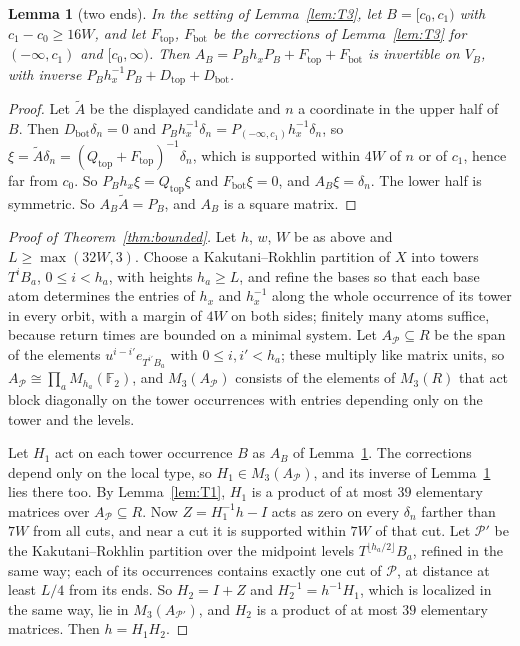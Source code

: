 \documentclass[11pt]{amsart}
\newtheorem{lemma}[theorem]{Lemma}
\theoremstyle{remark}
\newcommand{\F}{\mathbb F}
\begin{document}
\begin{lemma}[two ends]\label{lem:T4}
In the setting of Lemma~\ref{lem:T3}, let $B=[c_0,c_1)$ with
$c_1-c_0\ge16W$, and let $F_{\mathrm{top}}$, $F_{\mathrm{bot}}$ be the
corrections of Lemma~\ref{lem:T3} for $(-\infty,c_1)$ and $[c_0,\infty)$.
Then $A_B=P_Bh_xP_B+F_{\mathrm{top}}+F_{\mathrm{bot}}$ is invertible on
$V_B$, with inverse $P_Bh_x^{-1}P_B+D_{\mathrm{top}}+D_{\mathrm{bot}}$.
\end{lemma}

\begin{proof}
Let $\tilde A$ be the displayed candidate and $n$ a coordinate in the upper
half of $B$. Then $D_{\mathrm{bot}}\delta_n=0$ and
$P_Bh_x^{-1}\delta_n=P_{(-\infty,c_1)}h_x^{-1}\delta_n$, so
$\xi=\tilde A\delta_n=(Q_{\mathrm{top}}+F_{\mathrm{top}})^{-1}\delta_n$,
which is supported within $4W$ of $n$ or of $c_1$, hence far from $c_0$.
So $P_Bh_x\xi=Q_{\mathrm{top}}\xi$ and $F_{\mathrm{bot}}\xi=0$, and
$A_B\xi=\delta_n$. The lower half is symmetric. So $A_B\tilde A=P_B$, and
$A_B$ is a square matrix.
\end{proof}

\begin{proof}[Proof of Theorem~\ref{thm:bounded}]
Let $h$, $w$, $W$ be as above and $L\ge\max(32W,3)$. Choose a
Kakutani--Rokhlin partition of $X$ into towers $T^iB_a$, $0\le i<h_a$, with
heights $h_a\ge L$, and refine the bases so that each base atom determines
the entries of $h_x$ and $h_x^{-1}$ along the whole occurrence of its tower
in every orbit, with a margin of $4W$ on both sides; finitely many atoms
suffice, because return times are bounded on a minimal system. Let
$A_{\mathcal P}\subseteq R$ be the span of the elements
$u^{i-i'}e_{T^{i'}B_a}$ with $0\le i,i'<h_a$; these multiply like matrix
units, so $A_{\mathcal P}\cong\prod_aM_{h_a}(\F_2)$, and $M_3(A_{\mathcal P})$
consists of the elements of $M_3(R)$ that act block diagonally on the
tower occurrences with entries depending only on the tower and the levels.

Let $H_1$ act on each tower occurrence $B$ as $A_B$ of Lemma~\ref{lem:T4}.
The corrections depend only on the local type, so $H_1\in M_3(A_{\mathcal P})$,
and its inverse of Lemma~\ref{lem:T4} lies there too. By Lemma~\ref{lem:T1},
$H_1$ is a product of at most $39$ elementary matrices over
$A_{\mathcal P}\subseteq R$. Now $Z=H_1^{-1}h-I$ acts as zero on every
$\delta_n$ farther than $7W$ from all cuts, and near a cut it is supported
within $7W$ of that cut. Let $\mathcal P'$ be the Kakutani--Rokhlin
partition over the midpoint levels $T^{\lfloor h_a/2\rfloor}B_a$, refined
in the same way; each of its occurrences contains exactly one cut of
$\mathcal P$, at distance at least $L/4$ from its ends. So
$H_2=I+Z$ and $H_2^{-1}=h^{-1}H_1$, which is localized in the same way,
lie in $M_3(A_{\mathcal P'})$, and $H_2$ is a product of at most $39$
elementary matrices. Then $h=H_1H_2$.
\end{proof}
\end{document}
